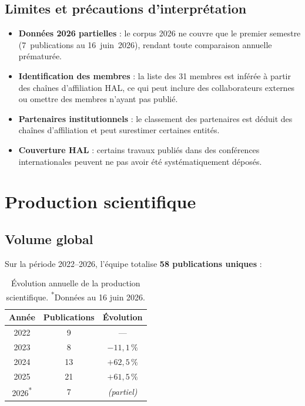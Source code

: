 \documentclass[a4paper,11pt]{article}
\begin{document}
\subsection{Limites et précautions d'interprétation}

\begin{itemize}
  \item \textbf{Données 2026 partielles} : le corpus 2026 ne couvre que le premier semestre (7~publications au 16~juin~2026), rendant toute comparaison annuelle prématurée.
  \item \textbf{Identification des membres} : la liste des 31 membres est inférée à partir des chaînes d'affiliation HAL, ce qui peut inclure des collaborateurs externes ou omettre des membres n'ayant pas publié.
  \item \textbf{Partenaires institutionnels} : le classement des partenaires est déduit des chaînes d'affiliation et peut surestimer certaines entités.
  \item \textbf{Couverture HAL} : certains travaux publiés dans des conférences internationales peuvent ne pas avoir été systématiquement déposés.
\end{itemize}

\section{Production scientifique}

\subsection{Volume global}

Sur la période 2022--2026, l'équipe totalise \textbf{58 publications uniques} :

\begin{table}[h!]
\centering
\begin{tabular}{ccc}
\toprule
\textbf{Année} & \textbf{Publications} & \textbf{Évolution} \\
\midrule
2022 & 9  & --- \\
2023 & 8  & $-11{,}1\,\%$ \\
2024 & 13 & $+62{,}5\,\%$ \\
2025 & 21 & $+61{,}5\,\%$ \\
2026\textsuperscript{*} & 7  & \textit{(partiel)} \\
\bottomrule
\end{tabular}
\caption{Évolution annuelle de la production scientifique. \textsuperscript{*}Données au 16 juin 2026.}
\end{table}
\end{document}
